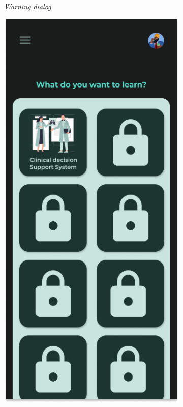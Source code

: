 \begin{figure}[H]
\begin{subfigure}[b]{0.23\textwidth}
	  \caption{\textit{Warning dialog}}
	  \label{fig:HasilMain3}
	\end{subfigure}
	\begin{subfigure}[b]{0.23\textwidth}
		\centering
	  \includegraphics[width=\linewidth]{contents/chapter-3/images/HF-materi-dt.png}

\end{subfigure}
\end{figure}
